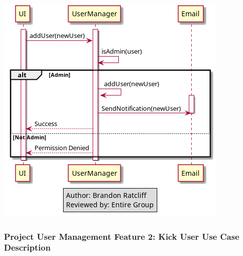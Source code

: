 \documentclass[twoside,letterpaper]{article}
\begin{document}
\includegraphics[width=\textwidth]{images/SequenceDiagrams/ProjectUserManagementAddUser}

\newpage
\subsubsection[Project User Management Feature 2: Kick User Use Case Description]{\rmfamily\bfseries\color{black}
	Project User Management Feature 2: Kick User Use Case Description}
\hypertarget{RefHeading22059017292}{}
\end{document}
